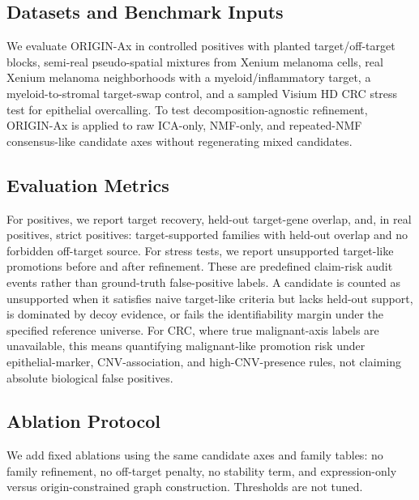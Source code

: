 \documentclass[conference]{IEEEtran}
\begin{document}
\subsection{Datasets and Benchmark Inputs}

We evaluate ORIGIN-Ax in controlled positives with planted target/off-target
blocks, semi-real pseudo-spatial mixtures from Xenium melanoma cells, real
Xenium melanoma neighborhoods with a myeloid/inflammatory target, a
myeloid-to-stromal target-swap control, and a sampled Visium HD CRC stress test
for epithelial overcalling. To test decomposition-agnostic refinement, ORIGIN-Ax
is applied to raw ICA-only, NMF-only, and repeated-NMF consensus-like candidate
axes without regenerating mixed candidates.

\subsection{Evaluation Metrics}

For positives, we report target recovery, held-out target-gene overlap, and, in
real positives, strict positives: target-supported families with held-out
overlap and no forbidden off-target source. For stress tests, we report
unsupported target-like promotions before and after refinement. These are
predefined claim-risk audit events rather than ground-truth false-positive
labels. A candidate is counted as unsupported when it satisfies naive
target-like criteria but lacks held-out support, is dominated by decoy evidence,
or fails the identifiability margin under the specified reference universe. For
CRC, where true malignant-axis labels are unavailable, this means quantifying
malignant-like promotion risk under epithelial-marker, CNV-association, and
high-CNV-presence rules, not claiming absolute biological false positives.

\subsection{Ablation Protocol}

We add fixed ablations using the same candidate axes and family tables: no
family refinement, no off-target penalty, no stability term, and expression-only
versus origin-constrained graph construction. Thresholds are not tuned.
\end{document}
